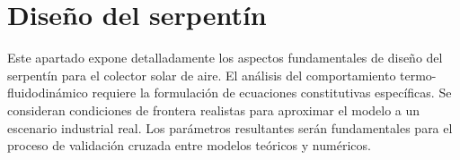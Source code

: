 \section{Diseño del serpentín}
\label{sec:cap05_serpentin}

Este apartado expone detalladamente los aspectos fundamentales de diseño del serpentín para el colector solar de aire.
El análisis del comportamiento termo-fluidodinámico requiere la formulación de ecuaciones constitutivas específicas.
Se consideran condiciones de frontera realistas para aproximar el modelo a un escenario industrial real.
Los parámetros resultantes serán fundamentales para el proceso de validación cruzada entre modelos teóricos y numéricos.
